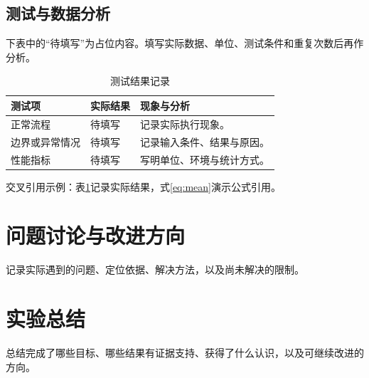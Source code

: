 \subsection{测试与数据分析}
下表中的“待填写”为占位内容。填写实际数据、单位、测试条件和重复次数后再作分析。
\begin{table}[H]
\centering
\caption{测试结果记录}
\label{tab:results}
\begin{tabularx}{\textwidth}{p{2.5cm}p{2.6cm}X}
\toprule 测试项 & 实际结果 & 现象与分析\\\midrule
正常流程 & 待填写 & 记录实际执行现象。\\
边界或异常情况 & 待填写 & 记录输入条件、结果与原因。\\
性能指标 & 待填写 & 写明单位、环境与统计方式。\\
\bottomrule
\end{tabularx}
\end{table}
交叉引用示例：表\ref{tab:results}记录实际结果，式\eqref{eq:mean}演示公式引用。

\section{问题讨论与改进方向}
记录实际遇到的问题、定位依据、解决方法，以及尚未解决的限制。

\section{实验总结}
总结完成了哪些目标、哪些结果有证据支持、获得了什么认识，以及可继续改进的方向。
